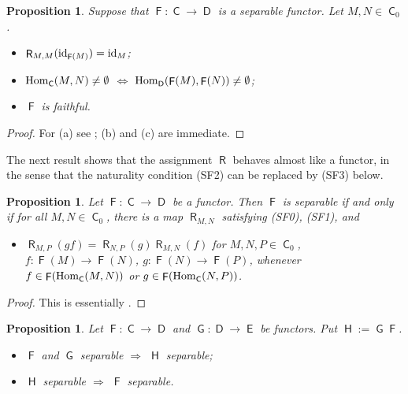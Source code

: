 \documentclass[12pt]{amsart}
\newtheorem{prop}[thm]{Proposition}
\theoremstyle{definition}
\newcommand{\id}{{\rm id}}
\newcommand{\Hom}{{\rm Hom}}
\DeclareMathOperator{\C}{\mathsf C}
\DeclareMathOperator{\D}{\mathsf D}
\DeclareMathOperator{\HH}{\mathsf H}
\DeclareMathOperator{\E}{\mathsf E}
\DeclareMathOperator{\F}{\mathsf F}
\DeclareMathOperator{\G}{\mathsf G}
\DeclareMathOperator{\R}{\mathsf R}
\begin{document}
\begin{prop}\label{prop:RFid}
Suppose that $\F : \C \to \D$ is a separable
functor. Let $M,N \in \C_0$.

\begin{itemize}[widest=(a)]

\item[{\rm (a)}] $\R_{M,M}(\id_{\F(M)}) = \id_{M}$;

\item[{\rm (b)}] $\Hom_{\C}(M,N) \neq \emptyset$
$\Longleftrightarrow$
$\Hom_{\D}(\F(M),\F(N)) \neq 
\emptyset$;

\item[{\rm (c)}] $\F$ is faithful.

\end{itemize}
\end{prop}

\begin{proof}
For (a) see \cite[p. 399]{nastasescu1989}; (b) and (c)
are immediate.
\end{proof}

The next result shows that the assignment $\R$ 
behaves almost like a functor,
in the sense that the naturality condition
(SF2) can be replaced by (SF3) below.

\begin{prop}\label{prop:newsep}
Let $\F : \C \to \D$ be a functor. 
Then $\F$ is 
separable if and only if for all 
$M,N \in \C_0$, there is a map $\R_{M,N}$ 
satisfying (SF0), (SF1), and 
\begin{itemize}[widest=(SF2)]

\item[{\rm (SF3)}] 
$\R_{M,P}(gf) = 
\R_{N,P}(g) \R_{M,N}(f)$ for $M,N,P \in \C_0$,
$f : \F(M)  \to  \F(N)$, 
\linebreak
$g :  \F(N)  \to  \F(P)$, 
whenever
$f \in \F( \Hom_{\C}(M,N) )$ or 
$g \in \F( \Hom_{\C}(N,P))$.
\end{itemize}
\end{prop}

\begin{proof}
This is essentially \cite[Lemma~1.1]{rafael1990}.
\end{proof}

\begin{prop}\label{prop:nastasescu}
Let $\F : \C \to \D$ and $\G : \D \to \E$
be functors. Put $\HH := \G \F$.

\begin{itemize}[widest=(a)]

\item[{\rm (a)}] 
$\F$ and $\G$ separable
$\Longrightarrow$ $\HH$ separable; 

\item[{\rm (b)}]
$\HH$ separable $\Longrightarrow$ 
$\F$ separable.

\end{itemize}
\end{prop}
\end{document}
